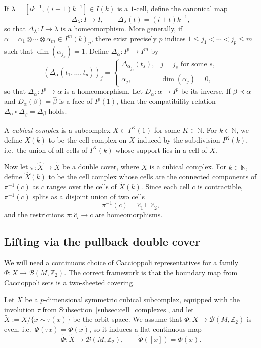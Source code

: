\documentclass[12pt,english]{article}
\theoremstyle{definition}
\begin{document}
If $\lambda=[ik^{-1},(i+1)k^{-1}]\in I(k)$ is a $1$-cell, define the canonical map
\[
\Delta_\lambda:I\to I,\qquad \Delta_\lambda(t)=(i+t)k^{-1},
\]
so that $\Delta_\lambda:I\to\lambda$ is a homeomorphism.
More generally, if $\alpha=\alpha_1\otimes\cdots\otimes\alpha_m\in I^m(k)_p$, there exist precisely
$p$ indices $1\le j_1<\cdots<j_p\le m$ such that $\dim(\alpha_{j_s})=1$.
Define $\Delta_\alpha:I^p\to I^m$ by
\[
(\Delta_\alpha(t_1,\dots,t_p))_j=
\begin{cases}
\Delta_{\alpha_{j_s}}(t_s), & j=j_s \text{ for some }s,\\
\alpha_j, & \dim(\alpha_j)=0,
\end{cases}
\]
so that $\Delta_\alpha:I^p\to \alpha$ is a homeomorphism. Let $D_\alpha:\alpha\to I^p$ be its inverse.
If $\beta\prec\alpha$ and $D_\alpha(\beta)=\hat\beta$ is a face of $I^p(1)$, then the compatibility relation $\Delta_\alpha\circ\Delta_{\hat\beta}=\Delta_\beta$ holds.

A \emph{cubical complex} is a subcomplex $X\subset I^K(1)$ for some $K\in\mathbb{N}$.
For $k\in\mathbb{N}$, we define $X(k)$ to be the cell complex on $X$ induced by the subdivision $I^K(k)$,
i.e.\ the union of all cells of $I^K(k)$ whose support lies in a cell of $X$.

Now let $\pi:\widehat X\to \tilde X$ be a double cover, where $\tilde X$ is a cubical complex.
For $k\in\mathbb{N}$, define $\widehat X(k)$ to be the cell complex whose cells are the connected components
of $\pi^{-1}(c)$ as $c$ ranges over the cells of $\tilde X(k)$.
Since each cell $c$ is contractible, $\pi^{-1}(c)$ splits as a disjoint union of two cells
\[
\pi^{-1}(c)=\hat c_1\sqcup \hat c_2,
\]
and the restrictions $\pi:\hat c_i\to c$ are homeomorphisms.

\subsection{Lifting via the pullback double cover}
\label{subsec:lifting}

We will need a continuous choice of Caccioppoli representatives for a family
$\Phi:X\to \mathcal B(M,\mathbb{Z}_2)$. The correct framework is that the
boundary map from Caccioppoli sets is a two-sheeted covering.

Let $X$ be a $p$-dimensional symmetric cubical subcomplex, equipped with the involution $\tau$ from Subsection~\ref{subsec:cell_complexes}, and let $\tilde X:=X/\{x\sim \tau(x)\}$ be the orbit space. We assume that $\Phi:X\to \mathcal B(M,\mathbb{Z}_2)$ is even, i.e.\ $\Phi(\tau x)=\Phi(x)$, so it induces a flat-continuous map
\[
\tilde \Phi:\tilde X\to \mathcal B(M,\mathbb{Z}_2),
\qquad
\tilde \Phi([x])=\Phi(x).
\]
\end{document}
